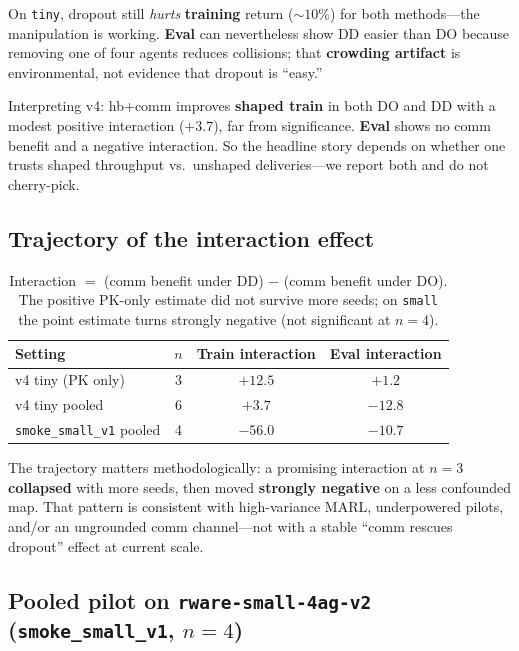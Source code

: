 \documentclass[conference,onecolumn]{IEEEtran}
\begin{document}
On \texttt{tiny}, dropout still \emph{hurts} \textbf{training} return (${\sim}10\%$) for both methods---the manipulation is working. \textbf{Eval} can nevertheless show DD easier than DO because removing one of four agents reduces collisions; that \textbf{crowding artifact} is environmental, not evidence that dropout is ``easy.''

Interpreting v4: hb+comm improves \textbf{shaped train} in both DO and DD with a modest positive interaction ($+3.7$), far from significance. \textbf{Eval} shows no comm benefit and a negative interaction. So the headline story depends on whether one trusts shaped throughput vs.\ unshaped deliveries---we report both and do not cherry-pick.

\subsection{Trajectory of the interaction effect}

\begin{table}[!t]
\centering
\small
\caption{Interaction $=$ (comm benefit under DD) $-$ (comm benefit under DO). The positive PK-only estimate did not survive more seeds; on \texttt{small} the point estimate turns strongly negative (not significant at $n{=}4$).}
\label{tab:interaction}
\begin{tabular}{@{}lccc@{}}
\toprule
\textbf{Setting} & \textbf{$n$} & \textbf{Train interaction} & \textbf{Eval interaction} \\
\midrule
v4 tiny (PK only)   & 3 & $+12.5$ & $+1.2$ \\
v4 tiny pooled      & 6 & $+3.7$  & $-12.8$ \\
\texttt{smoke\_small\_v1} pooled & 4 & $-56.0$ & $-10.7$ \\
\bottomrule
\end{tabular}
\end{table}

The trajectory matters methodologically: a promising interaction at $n{=}3$ \textbf{collapsed} with more seeds, then moved \textbf{strongly negative} on a less confounded map. That pattern is consistent with high-variance MARL, underpowered pilots, and/or an ungrounded comm channel---not with a stable ``comm rescues dropout'' effect at current scale.

\subsection{Pooled pilot on \texttt{rware-small-4ag-v2} (\texttt{smoke\_small\_v1}, $n{=}4$)}
\end{document}
